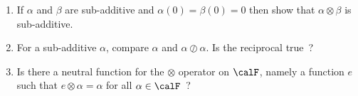 \begin{problem}
\begin{enumerate}
     \item If $\alpha$ and $\beta$ are sub-additive and
     $\alpha(0)=\beta(0)=0$ then show that $\alpha\otimes\beta$ is
     sub-additive.
        \item For a sub-additive $\alpha$, compare $\alpha$ and $\alpha
        \oslash \alpha$. Is the reciprocal true~?
        \item Is there a neutral function for the $\otimes$ operator on $\calF$, namely
        a function $e$ such that $e \otimes \alpha = \alpha$ for all
        $\alpha \in \calF$~?
\end{enumerate}
\end{problem}
